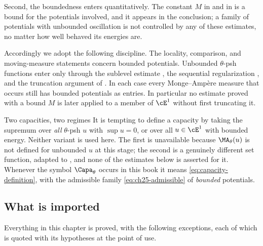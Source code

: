 Second, the boundedness enters quantitatively.  The constant
$M$ in  and in
 is a bound for the potentials
involved, and it appears in the conclusion; a family of potentials with
unbounded oscillation is not controlled by any of these estimates, no matter
how well behaved its energies are.

Accordingly we adopt the following discipline.  The locality, comparison,
and moving-measure statements concern bounded potentials.  Unbounded
$\theta$-psh functions enter only through the sublevel estimate
, the sequential regularization
, and the truncation argument of
.  In each case every Monge--Amp\`ere measure that occurs
still has bounded potentials as entries.  In particular no estimate proved
with a bound $M$ is later applied to a member of $\cE^1$ without first
truncating it.

\begin{warning}{Two capacities, two regimes}
It is tempting to define a capacity by taking the supremum over
\emph{all} $\theta$-psh $u$ with $\sup u=0$, or over all
$u\in\cE^1$ with bounded energy.  Neither variant is used here.  The first
is unavailable because $\MA_\theta(u)$ is not defined for unbounded $u$ at
this stage; the second is a genuinely different set
function, adapted to , and none of the
estimates below is asserted for it.  Whenever the symbol $\Capa_\theta$
occurs in this book it means \eqref{eq:capacity-definition}, with the
admissible family \eqref{eq:ch25-admissible} of \emph{bounded} potentials.
\end{warning}

\subsection{What is imported}
\label{sec:ch25-imported}

Everything in this chapter is proved, with the following exceptions, each of
which is quoted with its hypotheses at the point of use.

